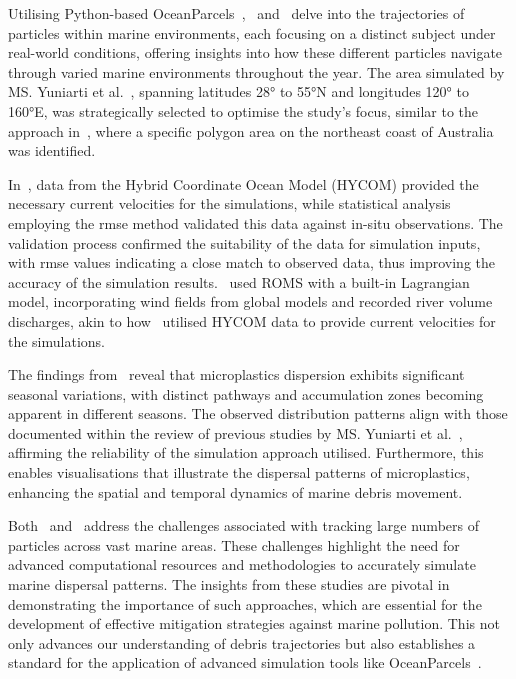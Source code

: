Utilising Python-based OceanParcels~\cite{20},~\cite{37} and~\cite{38} delve into the trajectories of particles within marine environments, each focusing on a distinct subject under real-world conditions, offering insights into how these different particles navigate through varied marine environments throughout the year. The area simulated by MS. Yuniarti et al.~\cite{37}, spanning latitudes 28° to 55°N and longitudes 120° to 160°E, was strategically selected to optimise the study's focus, similar to the approach in~\cite{38}, where a specific polygon area on the northeast coast of Australia was identified. 

In~\cite{37}, data from the Hybrid Coordinate Ocean Model (HYCOM) provided the necessary current velocities for the simulations, while statistical analysis employing the \acrshort{rmse} method validated this data against in-situ observations. The validation process confirmed the suitability of the data for simulation inputs, with \acrshort{rmse} values indicating a close match to observed data, thus improving the accuracy of the simulation results.~\cite{38} used ROMS with a built-in Lagrangian model, incorporating wind fields from global models and recorded river volume discharges, akin to how~\cite{37} utilised HYCOM data to provide current velocities for the simulations.

The findings from~\cite{37} reveal that microplastics dispersion exhibits significant seasonal variations, with distinct pathways and accumulation zones becoming apparent in different seasons. The observed distribution patterns align with those documented within the review of previous studies by MS. Yuniarti et al.~\cite{37}, affirming the reliability of the simulation approach utilised. Furthermore, this enables visualisations that illustrate the dispersal patterns of microplastics, enhancing the spatial and temporal dynamics of marine debris movement.

Both~\cite{37} and~\cite{38} address the challenges associated with tracking large numbers of particles across vast marine areas. These challenges highlight the need for advanced computational resources and methodologies to accurately simulate marine dispersal patterns. The insights from these studies are pivotal in demonstrating the importance of such approaches, which are essential for the development of effective mitigation strategies against marine pollution. This not only advances our understanding of debris trajectories but also establishes a standard for the application of advanced simulation tools like OceanParcels~\cite{20}.

